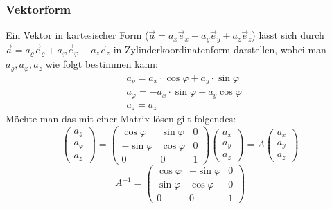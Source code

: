 \documentclass[a4paper,10pt]{scrartcl}
\begin{document}
            \subsubsection{Vektorform}
                Ein Vektor in kartesischer Form (\( \vec{a}= a_x\vec{e}_x + a_y\vec{e}_y + a_z\vec{e}_z \)) lässt sich durch \( \vec{a}= a_\varrho\vec{e}_\varrho + a_\varphi\vec{e}_\varphi + a_z\vec{e}_z \)
                in Zylinderkoordinatenform darstellen, wobei man \(a_\varrho, a_\varphi, a_z\) wie folgt bestimmen kann: 
                \begin{equation*}
                    \begin{aligned}
                        & a_\varrho = a_x \cdot \cos \varphi + a_y \cdot \sin \varphi \\
                        & a_\varphi = -a_x \cdot \sin \varphi + a_y \cos \varphi \\
                        & a_z = a_z
                    \end{aligned}
                \end{equation*}
                Möchte man das mit einer Matrix lösen gilt folgendes:   
                \begin{equation*}
                    \begin{pmatrix}
                        a_\varrho \\ a_\varphi \\ a_z
                    \end{pmatrix} = 
                    \begin{pmatrix}
                        \cos \varphi & \sin \varphi & 0 \\
                        -\sin \varphi & \cos \varphi & 0 \\
                        0 & 0 & 1
                    \end{pmatrix}
                    \begin{pmatrix}
                        a_x \\ a_y \\ a_z
                    \end{pmatrix} = A 
                    \begin{pmatrix}
                        a_x \\ a_y \\ a_z
                    \end{pmatrix}
                \end{equation*}     
                \begin{equation*}
                    A^{-1} = \begin{pmatrix} \cos \varphi & -\sin \varphi & 0 \\ 
                        \sin \varphi & \cos \varphi & 0 \\
                        0 & 0 & 1  \end{pmatrix}
                \end{equation*}
\end{document}
